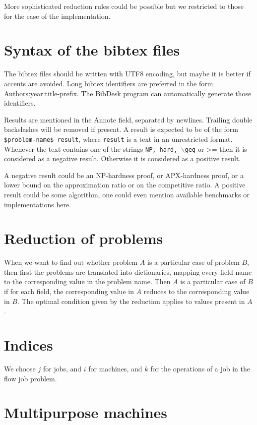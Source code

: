 \documentclass{article}
\begin{document}
More sophisticated reduction rules could be possible but we restricted to those for the ease of the implementation.


\section{Syntax of the bibtex files}

The bibtex files should be written with UTF8 encoding, but maybe it is better if accents are avoided.  Long bibtex identifiers are preferred in the form Authors:year:title-prefix.  The BibDesk program can automatically generate those identifiers.

Results are mentioned in the Annote field, separated by newlines. Trailing double backslashes will be removed if present.  A result is expected to be of the form \texttt{\$problem-name\$ result}, where \texttt{result} is a text in an unrestricted format.  Whenever the text contains one of the strings \texttt{NP, hard, $\backslash$geq} or >= then it is considered as a negative result. Otherwise it is considered as a positive result.

A negative result could be an NP-hardness proof, or APX-hardness proof, or a lower bound on the approximation ratio or on the competitive ratio.  A positive result could be some algorithm, one could even mention available benchmarks or implementations here.

\section{Reduction of problems}

When we want to find out whether problem $A$ is a particular case of problem $B$, then first the problems are translated into dictionaries, mapping every field name to the corresponding value in the problem name.  Then $A$ is a particular case of $B$ if for each field, the corresponding value in $A$ reduces to the corresponding value in $B$.  The optimal condition given by the reduction applies to values present in $A$.

\section{Indices}

We choose $j$ for jobs, and $i$ for machines, and $k$ for the operations of a job in the flow job problem.

\section{Multipurpose machines}
\end{document}
